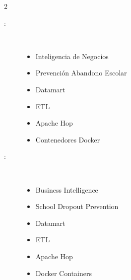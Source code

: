\begin{multicols}{2}
\begin{description}
\item [\palabraschaveprincipal:] \mbox{} \\[-20pt]
  \begin{itemize}
    \item Inteligencia de Negocios
    \item Prevención Abandono Escolar
    \item Datamart
    \item ETL
    \item Apache Hop
    \item Contenedores Docker
  \end{itemize}
\end{description}
\begin{description}
\item [\palabraschavesecundaria:] \mbox{} \\[-20pt]
  \begin{itemize}
    \item Business Intelligence
    \item School Dropout Prevention
    \item Datamart
    \item ETL
    \item Apache Hop
    \item Docker Containers
  \end{itemize}
\end{description}
\end{multicols}
